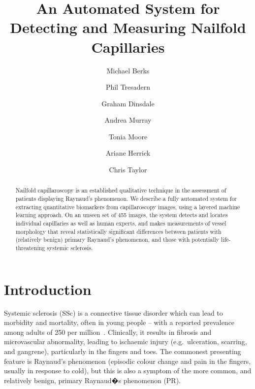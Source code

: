 \documentclass[runningheads,a4paper]{llncs}
\def\eg{e.g.}
\begin{document}
\mainmatter  %

\title{An Automated System for Detecting and Measuring Nailfold Capillaries}


%
%
\author{Michael Berks \and Phil Tresadern \and Graham Dinsdale \and Andrea Murray \and Tonia Moore \and Ariane Herrick \and Chris Taylor}


\maketitle


\begin{abstract}
Nailfold capillaroscopy is an established qualitative technique in the assessment of patients displaying Raynaud's phenomenon. We describe a fully automated system for extracting quantitative biomarkers from capillaroscopy images, using a layered machine learning approach. On an unseen set of 455 images, the system detects and locates individual capillaries as well as human experts, and makes measurements of vessel morphology that reveal statistically significant differences between patients with (relatively benign) primary Raynaud's phenomenon, and those with potentially life-threatening systemic sclerosis.
\end{abstract}

\section{Introduction}
\label{s:introduction}
Systemic sclerosis (SSc) is a connective tissue disorder which can lead to morbidity and mortality, often in young people -- with a reported prevalence among adults of 250 per million~\cite{Mayes_etal_AR03}. Clinically, it results in fibrosis and microvascular abnormality, leading to ischaemic injury (\eg~ulceration, scarring, and gangrene), particularly in the fingers and toes. The commonest presenting feature is Raynaud's phenomenon (episodic colour change and pain in the fingers, usually in response to cold), but this is also a symptom of the more common, and relatively benign, primary Raynaud�s phenomenon (PR).
\end{document}
